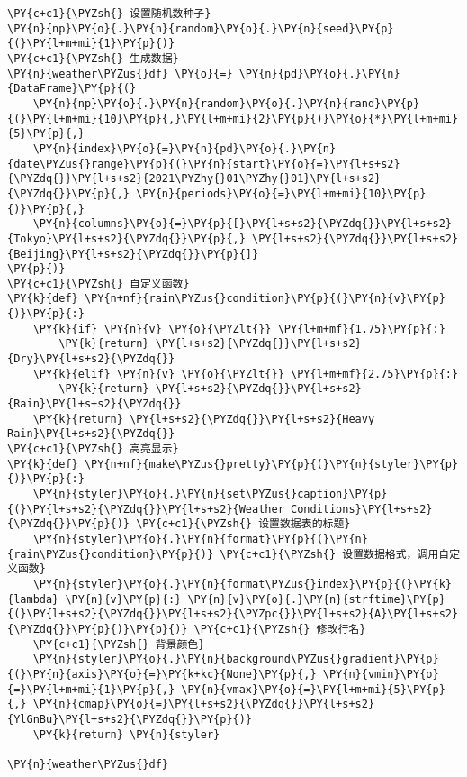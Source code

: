    \begin{tcolorbox}[breakable, size=fbox, boxrule=1pt, pad at break*=1mm,colback=cellbackground, colframe=cellborder]
\begin{Verbatim}[commandchars=\\\{\}]
\PY{c+c1}{\PYZsh{} 设置随机数种子}
\PY{n}{np}\PY{o}{.}\PY{n}{random}\PY{o}{.}\PY{n}{seed}\PY{p}{(}\PY{l+m+mi}{1}\PY{p}{)}
\PY{c+c1}{\PYZsh{} 生成数据}
\PY{n}{weather\PYZus{}df} \PY{o}{=} \PY{n}{pd}\PY{o}{.}\PY{n}{DataFrame}\PY{p}{(}
    \PY{n}{np}\PY{o}{.}\PY{n}{random}\PY{o}{.}\PY{n}{rand}\PY{p}{(}\PY{l+m+mi}{10}\PY{p}{,}\PY{l+m+mi}{2}\PY{p}{)}\PY{o}{*}\PY{l+m+mi}{5}\PY{p}{,}
    \PY{n}{index}\PY{o}{=}\PY{n}{pd}\PY{o}{.}\PY{n}{date\PYZus{}range}\PY{p}{(}\PY{n}{start}\PY{o}{=}\PY{l+s+s2}{\PYZdq{}}\PY{l+s+s2}{2021\PYZhy{}01\PYZhy{}01}\PY{l+s+s2}{\PYZdq{}}\PY{p}{,} \PY{n}{periods}\PY{o}{=}\PY{l+m+mi}{10}\PY{p}{)}\PY{p}{,}
    \PY{n}{columns}\PY{o}{=}\PY{p}{[}\PY{l+s+s2}{\PYZdq{}}\PY{l+s+s2}{Tokyo}\PY{l+s+s2}{\PYZdq{}}\PY{p}{,} \PY{l+s+s2}{\PYZdq{}}\PY{l+s+s2}{Beijing}\PY{l+s+s2}{\PYZdq{}}\PY{p}{]}
\PY{p}{)}
\PY{c+c1}{\PYZsh{} 自定义函数}
\PY{k}{def} \PY{n+nf}{rain\PYZus{}condition}\PY{p}{(}\PY{n}{v}\PY{p}{)}\PY{p}{:}
    \PY{k}{if} \PY{n}{v} \PY{o}{\PYZlt{}} \PY{l+m+mf}{1.75}\PY{p}{:}
        \PY{k}{return} \PY{l+s+s2}{\PYZdq{}}\PY{l+s+s2}{Dry}\PY{l+s+s2}{\PYZdq{}}
    \PY{k}{elif} \PY{n}{v} \PY{o}{\PYZlt{}} \PY{l+m+mf}{2.75}\PY{p}{:}
        \PY{k}{return} \PY{l+s+s2}{\PYZdq{}}\PY{l+s+s2}{Rain}\PY{l+s+s2}{\PYZdq{}}
    \PY{k}{return} \PY{l+s+s2}{\PYZdq{}}\PY{l+s+s2}{Heavy Rain}\PY{l+s+s2}{\PYZdq{}}
\PY{c+c1}{\PYZsh{} 高亮显示}
\PY{k}{def} \PY{n+nf}{make\PYZus{}pretty}\PY{p}{(}\PY{n}{styler}\PY{p}{)}\PY{p}{:}
    \PY{n}{styler}\PY{o}{.}\PY{n}{set\PYZus{}caption}\PY{p}{(}\PY{l+s+s2}{\PYZdq{}}\PY{l+s+s2}{Weather Conditions}\PY{l+s+s2}{\PYZdq{}}\PY{p}{)} \PY{c+c1}{\PYZsh{} 设置数据表的标题}
    \PY{n}{styler}\PY{o}{.}\PY{n}{format}\PY{p}{(}\PY{n}{rain\PYZus{}condition}\PY{p}{)} \PY{c+c1}{\PYZsh{} 设置数据格式，调用自定义函数}
    \PY{n}{styler}\PY{o}{.}\PY{n}{format\PYZus{}index}\PY{p}{(}\PY{k}{lambda} \PY{n}{v}\PY{p}{:} \PY{n}{v}\PY{o}{.}\PY{n}{strftime}\PY{p}{(}\PY{l+s+s2}{\PYZdq{}}\PY{l+s+s2}{\PYZpc{}}\PY{l+s+s2}{A}\PY{l+s+s2}{\PYZdq{}}\PY{p}{)}\PY{p}{)} \PY{c+c1}{\PYZsh{} 修改行名}
    \PY{c+c1}{\PYZsh{} 背景颜色}
    \PY{n}{styler}\PY{o}{.}\PY{n}{background\PYZus{}gradient}\PY{p}{(}\PY{n}{axis}\PY{o}{=}\PY{k+kc}{None}\PY{p}{,} \PY{n}{vmin}\PY{o}{=}\PY{l+m+mi}{1}\PY{p}{,} \PY{n}{vmax}\PY{o}{=}\PY{l+m+mi}{5}\PY{p}{,} \PY{n}{cmap}\PY{o}{=}\PY{l+s+s2}{\PYZdq{}}\PY{l+s+s2}{YlGnBu}\PY{l+s+s2}{\PYZdq{}}\PY{p}{)}
    \PY{k}{return} \PY{n}{styler}

\PY{n}{weather\PYZus{}df}
\end{Verbatim}
\end{tcolorbox}

